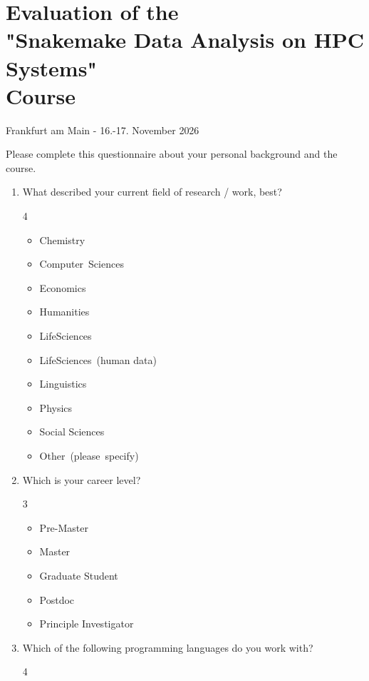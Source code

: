 \documentclass{scrartcl}
\begin{document}
\section*{Evaluation of the\\"Snakemake Data Analysis on HPC Systems"\\Course}

\begin{center}
    Frankfurt am Main - 16.-17. November 2026
\end{center}


Please complete this questionnaire about your personal background and the course.
\begin{enumerate}
\item What described your current field of research / work, best?
  \begin{multicols}{4}
    \begin{itemize}[label={\Square}]
      \item Chemistry
      \item Computer\ Sciences
      \item Economics
      \item Humanities
      \item LifeSciences
      \item LifeSciences\ (human data)
      \item Linguistics
      \item Physics
      \item Social Sciences
      \item Other\ (please\ specify)
    \end{itemize}
  \end{multicols}
\item Which is your career level?
  \begin{multicols}{3}
    \begin{itemize}[label={\Square}]
      \item Pre-Master
      \item Master
      \item Graduate Student
      \item Postdoc
      \item Principle Investigator
    \end{itemize}
  \end{multicols}
\item Which of the following programming languages do you work with?
  \begin{multicols}{4}
    \begin{itemize}[label={\Square}]

\end{itemize}
\end{multicols}
\end{enumerate}
\end{document}
